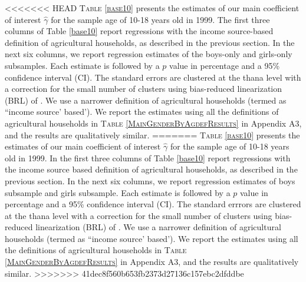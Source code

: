 \documentclass[12pt,letterpaper]{article}
\newcommand{\0}{\ensuremath{\mbox{\boldmath $0$}}}
\begin{document}
<<<<<<< HEAD
\textsc{\small Table \ref{base10}} presents the estimates of our main coefficient of interest $\hat{\gamma}$ for the sample age of 10-18 years old in 1999. The first three columns of Table \ref{base10} report regressions with the income source-based definition of agricultural households, as described in the previous section. In the next six columns, we report regression estimates of the boys-only and girls-only subsamples. Each estimate is followed by a $p$ value in percentage and a 95\% confidence interval (CI). The standard errors are clustered at the thana level with a correction for the small number of clusters using bias-reduced linearization (BRL) of \citet{PustejovskyTipton2018}. We use a narrower definition of agricultural households (termed as ``income source' based'). We report the estimates using all the definitions of agricultural households in \textsc{Table \ref{MainGenderByAgdefResults}} in Appendix A3, and the results are qualitatively similar. 
=======
\textsc{\small Table \ref{base10}} presents the estimates of our main coefficient of interest $\hat{\gamma}$ for the sample age of 10-18 years old in 1999. In the first three columns of Table \ref{base10} report regressions with the income source based definition of agricultural households, as described in the previous section. In the next six columns, we report regression estimates of boys subsample and girls subsample. Each estimate is followed by a $p$ value in percentage and a 95\% confidence interval (CI). The standard errrors are clustered at the thana level with a correction for the small number of clusters using bias-reduced linearization (BRL) of \citet{PustejovskyTipton2018}. We use a narrower definition of agricultural households (termed as ``income source' based'). We report the estimates using all the definitions of agricultural households in \textsc{Table \ref{MainGenderByAgdefResults}} in Appendix A3, and the results are qualitatively similar. 
>>>>>>> 41dec8f560b653fb2373d27136c157ebc2dfddbe
\end{document}
